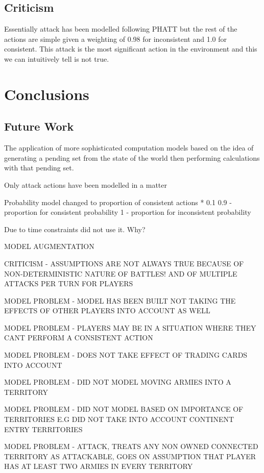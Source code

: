 \documentclass[parskip]{cs4rep}
\begin{document}
\section{Criticism}

Essentially attack has been modelled following PHATT but the rest of the actions are simple given a weighting of 0.98 for inconsistent and 1.0 for consistent. This attack is the most significant action in the environment and this we can intuitively tell is not true.

\chapter{Conclusions}

\section{Future Work}

The application of more sophisticated computation models based on the idea of generating a pending set from the state of the world then performing calculations with that pending set.

Only attack actions have been modelled in a matter 

Probability model changed to proportion of consistent actions * 0.1 
0.9 - proportion for consistent probability
1 - proportion for inconsistent probability

Due to time constraints did not use it. Why?

MODEL AUGMENTATION

CRITICISM - ASSUMPTIONS ARE NOT ALWAYS TRUE BECAUSE OF NON-DETERMINISTIC NATURE OF BATTLES! AND OF MULTIPLE ATTACKS PER TURN FOR PLAYERS

MODEL PROBLEM - MODEL HAS BEEN BUILT NOT TAKING THE EFFECTS OF OTHER PLAYERS INTO ACCOUNT AS WELL

MODEL PROBLEM - PLAYERS MAY BE IN A SITUATION WHERE THEY CANT PERFORM A CONSISTENT ACTION

MODEL PROBLEM - DOES NOT TAKE EFFECT OF TRADING CARDS INTO ACCOUNT

MODEL PROBLEM - DID NOT MODEL MOVING ARMIES INTO A TERRITORY

MODEL PROBLEM - DID NOT MODEL BASED ON IMPORTANCE OF TERRITORIES E.G DID NOT TAKE INTO ACCOUNT CONTINENT ENTRY TERRITORIES

MODEL PROBLEM - ATTACK, TREATS ANY NON OWNED CONNECTED TERRITORY AS ATTACKABLE, GOES ON ASSUMPTION THAT PLAYER HAS AT LEAST TWO ARMIES IN EVERY TERRITORY
\end{document}
